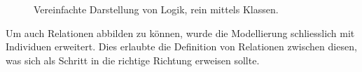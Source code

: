 \begin{figure}[H]
\centering {}
\caption{Vereinfachte Darstellung von Logik, rein mittels Klassen.\label{fig:prolog_logik_baum}\protect\footnotemark}
\end{figure}

\newpage

Um auch Relationen abbilden zu können, wurde die Modellierung schliesslich mit Individuen erweitert. Dies erlaubte die Definition von Relationen zwischen diesen, was sich als Schritt in die richtige Richtung erweisen sollte.

